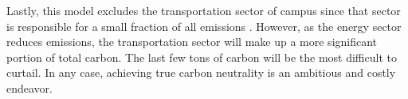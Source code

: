 Lastly, this model excludes the transportation sector of campus since that sector
is responsible for a small fraction of all emissions
\cite{institute_for_sustainability_energy_and_environment_illinois_2020}. However,
as the energy sector reduces emissions, the transportation sector will make up a
more significant portion of total carbon. The last few tons of carbon will be the most difficult
to curtail. In any case, achieving true carbon neutrality is an ambitious and costly
endeavor.
